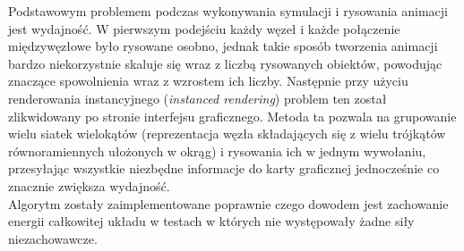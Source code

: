 \documentclass[12pt, letterpaper]{report}
\begin{document}
    Podstawowym problemem podczas wykonywania symulacji i rysowania animacji jest wydajność. 
    W pierwszym podejściu każdy węzeł i każde połączenie międzywęzłowe było rysowane osobno,
    jednak takie sposób tworzenia animacji bardzo niekorzystnie skaluje się wraz z liczbą rysowanych
    obiektów, powodując znaczące spowolnienia wraz z wzrostem ich liczby.
    Następnie przy użyciu renderowania instancyjnego (\emph{instanced rendering}) 
    problem ten został zlikwidowany po stronie interfejsu graficznego. 
    Metoda ta pozwala na grupowanie wielu siatek wielokątów 
    (reprezentacja węzła składających się z wielu trójkątów równoramiennych ułożonych w okrąg) i
    rysowania ich w jednym wywołaniu, przesyłając wszystkie niezbędne informacje do karty 
    graficznej jednocześnie co znacznie zwiększa wydajność. \\

    Algorytm zostały zaimplementowane poprawnie czego dowodem jest zachowanie energii całkowitej układu
    w testach w których nie występowały żadne siły niezachowawcze.

    


\end{document}
